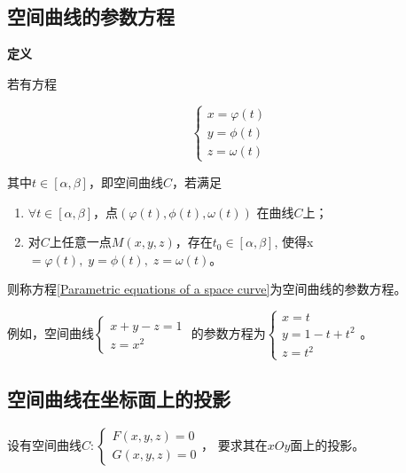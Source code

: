 \documentclass[12pt, a4paper]{article}
\numberwithin{equation}{section}
\begin{document}
\subsection{空间曲线的参数方程}

    \textbf{定义}

    若有方程

    \begin{equation}
        \left\{\begin{array}{l}
        x=\varphi\left(t\right) \\
        y=\phi\left(t\right) \\
        z=\omega\left(t\right)
        \end{array}\right.
        \label{Parametric equations of a space curve}
    \end{equation}

    其中\(t \in \left[\alpha, \beta\right]\)，即空间曲线\(C\)，若满足

    \begin{enumerate}
        \item \(\forall t \in \left[\alpha, \beta\right]\)，点\(\left(
            \varphi\left(t\right),\phi\left(t\right),\omega\left(t\right)\right)\)
            在曲线\(C\)上；
        \item 对\(C\)上任意一点\(M\left(x,y,z\right)\)，存在\(t_0 \in \left[\alpha, \beta\right]\),
            使得x\(=\varphi\left(t\right),\; y=\phi\left(t\right),\; z=\omega\left(t\right)\)。
    \end{enumerate}

    则称方程\ref{Parametric equations of a space curve}为空间曲线的参数方程。

    例如，空间曲线$\left\{\begin{array}{c}x+y-z=1 \\ z=x^2\end{array}\right.$
    的参数方程为$\left\{\begin{array}{l}x=t \\ y=1-t+t^2 \\ z=t^2\end{array}\right.$。

\subsection{空间曲线在坐标面上的投影}

    设有空间曲线$C: \left\{\begin{array}{l} F(x, y, z)=0 \\ G(x, y, z)=0 \end{array}\right.$，
    要求其在\(xOy\)面上的投影。
\end{document}
